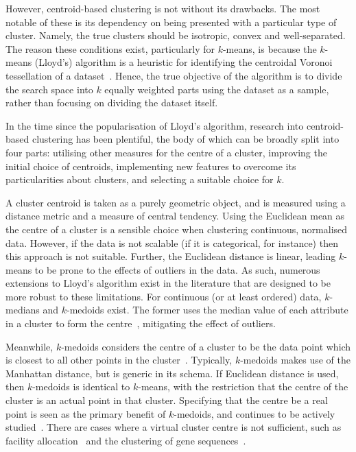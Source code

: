 However, centroid-based clustering is not without its drawbacks. The most
notable of these is its dependency on being presented with a particular type of
cluster. Namely, the true clusters should be isotropic, convex and
well-separated. The reason these conditions exist, particularly for \(k\)-means,
is because the \(k\)-means (Lloyd's) algorithm is a heuristic for identifying
the centroidal Voronoi tessellation of a dataset~\cite{Du2006}. Hence, the true
objective of the algorithm is to divide the search space into \(k\) equally
weighted parts using the dataset as a sample, rather than focusing on dividing
the dataset itself.

In the time since the popularisation of Lloyd's algorithm, research into
centroid-based clustering has been plentiful, the body of which can be broadly
split into four parts: utilising other measures for the centre of a cluster,
improving the initial choice of centroids, implementing new features to
overcome its particularities about clusters, and selecting a suitable choice for
\(k\).

A cluster centroid is taken as a purely geometric object, and is measured using
a distance metric and a measure of central tendency. Using the Euclidean mean as
the centre of a cluster is a sensible choice when clustering continuous,
normalised data. However, if the data is not scalable (if it is categorical, for
instance) then this approach is not suitable. Further, the Euclidean distance is
linear, leading \(k\)-means to be prone to the effects of outliers in the data.
As such, numerous extensions to Lloyd's algorithm exist in the literature that
are designed to be more robust to these limitations. For continuous (or at least
ordered) data, \(k\)-medians and \(k\)-medoids exist. The former uses the median
value of each attribute in a cluster to form the
centre~\cite{Arya2001,Bradley1997}, mitigating the effect of outliers.

Meanwhile, \(k\)-medoids considers the centre of a cluster to be the data point
which is closest to all other points in the cluster~\cite{Kaufman1987}.
Typically, \(k\)-medoids makes use of the Manhattan distance, but is generic in
its schema. If Euclidean distance is used, then \(k\)-medoids is identical to
\(k\)-means, with the restriction that the centre of the cluster is an actual
point in that cluster. Specifying that the centre be a real point is seen as the
primary benefit of \(k\)-medoids, and continues to be actively
studied~\cite{Schubert2019,Ushakov2021}. There are cases where a virtual cluster
centre is not sufficient, such as facility allocation~\cite{Chen2016,Wang2020}
and the clustering of gene sequences~\cite{Johnson2018}.

